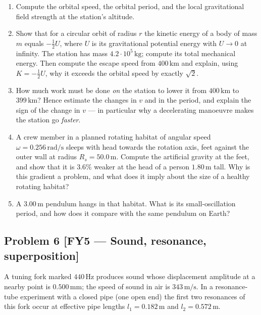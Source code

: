 \documentclass[11pt,a4paper]{article}
\newcommand{\problem}[3]{%
  \subsection*{Problem #1 \;\textnormal{\small[#2]}}\label{prob:#3}%
}
\newcommand{\unit}[1]{\,\mathrm{#1}}
\newenvironment{parts}{\begin{enumerate}[label=\textbf{\alph*)}]}{\end{enumerate}}
\begin{document}
\begin{parts}
\item Compute the orbital speed, the orbital period, and the local
      gravitational field strength at the station's altitude.
\item Show that for a circular orbit of radius $r$ the kinetic energy of a
      body of mass $m$ equals $-\tfrac12U$, where $U$ is its gravitational
      potential energy with $U\to0$ at infinity. The station has mass
      $4.2\cdot10^{5}\unit{kg}$; compute its total mechanical energy. Then
      compute the escape speed from $400\unit{km}$ and explain, using
      $K=-\tfrac12U$, why it exceeds the orbital speed by exactly
      $\sqrt2$.
\item How much work must be done \emph{on} the station to lower it from
      $400\unit{km}$ to $399\unit{km}$? Hence estimate the changes in $v$ and
      in the period, and explain the sign of the change in $v$ --- in
      particular why a decelerating manoeuvre makes the station go
      \emph{faster}.
\item A crew member in a planned rotating habitat of angular speed
      $\omega=0.256\unit{rad/s}$ sleeps with head towards the rotation axis,
      feet against the outer wall at radius $R_s=50.0\unit{m}$. Compute the
      artificial gravity at the feet, and show that it is $3.6\%$ weaker at
      the head of a person $1.80\unit{m}$ tall. Why is this gradient a
      problem, and what does it imply about the size of a healthy rotating
      habitat?
\item A $3.00\unit{m}$ pendulum hangs in that habitat. What is its
      small-oscillation period, and how does it compare with the same
      pendulum on Earth?
\end{parts}

\problem{6}{FY5 --- Sound, resonance, superposition}{fy5s}

A tuning fork marked $440\unit{Hz}$ produces sound whose displacement
amplitude at a nearby point is $0.500\unit{mm}$; the speed of sound in air is
$343\unit{m/s}$. In a resonance-tube experiment with a closed pipe (one open
end) the first two resonances of this fork occur at effective pipe lengths
$l_1=0.182\unit{m}$ and $l_2=0.572\unit{m}$.
\end{document}
